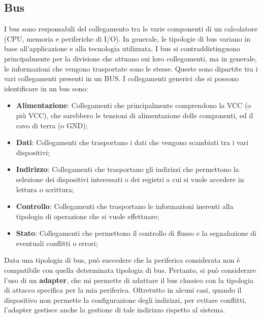 \subsection{Bus}
I bus sono responsabili del collegamento tra le varie componenti di un calcolatore (CPU, memoria e periferiche di I/O).
In generale, le tipologie di bus variano in base all'applicazione e alla tecnologia utilizzata. I bus si contraddistinguono principalmente per la divisione che attuano sui loro collegamenti, ma in generale, le informazioni che vengono trasportate sono le stesse.
Queste sono dipartite tra i vari collegamenti presenti in un BUS. I collegamenti generici che si possono identificare in un bus sono:
\begin{itemize}
    \item \textbf{Alimentazione}: Collegamenti che principalmente comprendono la VCC (o più VCC), che sarebbero le tensioni di alimentazione delle componenti, ed il cavo di terra (o GND);
    \item \textbf{Dati}: Collegamenti che trasportano i dati che vengono scambiati tra i vari dispositivi;
    \item \textbf{Indirizzo}: Collegamenti che trasportano gli indirizzi che permettono la selezione dei dispositivi interessati o dei registri a cui si vuole accedere in lettura o scrittura;
    \item \textbf{Controllo}: Collegamenti che trasportano le informazioni inerenti alla tipologia di operazione che si vuole effettuare;
    \item \textbf{Stato}: Collegamenti che permettono il controllo di flusso e la segnalazione di eventuali conflitti o errori;
\end{itemize}

Data una tipologia di bus, può succedere che la periferica considerata non è compatibile con quella determinata tipologia di bus. Pertanto, si può considerare l'uso di un \textbf{adapter}, che mi permette di adattare il bus classico con la tipologia di attacco specifica per la mia periferica. Oltretutto in alcuni casi, quando il dispositivo non permette la configurazione degli indirizzi, per evitare conflitti, l'adapter gestisce anche la gestione di tale indirizzo rispetto al sistema.

